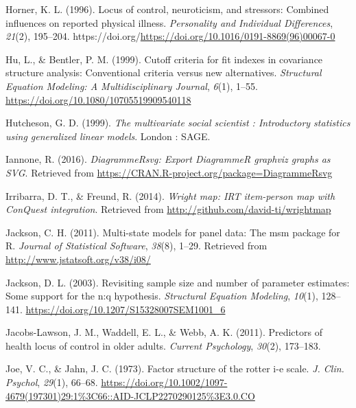 \documentclass[
  english,
  man]{apa6}
\newlength{\cslhangindent}
\newlength{\cslentryspacingunit} %
\newenvironment{CSLReferences}[2] %
 {%
  \setlength{\parindent}{0pt}
  \ifodd #1
  \let\oldpar\par
  \def\par{\hangindent=\cslhangindent\oldpar}
  \fi
  \setlength{\parskip}{#2\cslentryspacingunit}
 }%
 {}
\begin{document}
\begin{CSLReferences}{1}{0}
\leavevmode{}%
Horner, K. L. (1996). Locus of control, neuroticism, and stressors: Combined influences on reported physical illness. \emph{Personality and Individual Differences}, \emph{21}(2), 195--204. https://doi.org/\url{https://doi.org/10.1016/0191-8869(96)00067-0}

\leavevmode{}%
Hu, L., \& Bentler, P. M. (1999). Cutoff criteria for fit indexes in covariance structure analysis: Conventional criteria versus new alternatives. \emph{Structural Equation Modeling: A Multidisciplinary Journal}, \emph{6}(1), 1--55. \url{https://doi.org/10.1080/10705519909540118}

\leavevmode{}%
Hutcheson, G. D. (1999). \emph{The multivariate social scientist : Introductory statistics using generalized linear models}. London : SAGE.

\leavevmode{}%
Iannone, R. (2016). \emph{DiagrammeRsvg: Export DiagrammeR graphviz graphs as SVG}. Retrieved from \url{https://CRAN.R-project.org/package=DiagrammeRsvg}

\leavevmode{}%
Irribarra, D. T., \& Freund, R. (2014). \emph{Wright map: IRT item-person map with ConQuest integration}. Retrieved from \url{http://github.com/david-ti/wrightmap}

\leavevmode{}%
Jackson, C. H. (2011). Multi-state models for panel data: The {msm} package for {R}. \emph{Journal of Statistical Software}, \emph{38}(8), 1--29. Retrieved from \url{http://www.jstatsoft.org/v38/i08/}

\leavevmode{}%
Jackson, D. L. (2003). Revisiting sample size and number of parameter estimates: Some support for the n:q hypothesis. \emph{Structural Equation Modeling}, \emph{10}(1), 128--141. \url{https://doi.org/10.1207/S15328007SEM1001_6}

\leavevmode{}%
Jacobs-Lawson, J. M., Waddell, E. L., \& Webb, A. K. (2011). Predictors of health locus of control in older adults. \emph{Current Psychology}, \emph{30}(2), 173--183.

\leavevmode{}%
Joe, V. C., \& Jahn, J. C. (1973). Factor structure of the rotter i-e scale. \emph{J. Clin. Psychol}, \emph{29}(1), 66--68. \url{https://doi.org/10.1002/1097-4679(197301)29:1\%3C66::AID-JCLP2270290125\%3E3.0.CO}


\end{CSLReferences}
\end{document}

